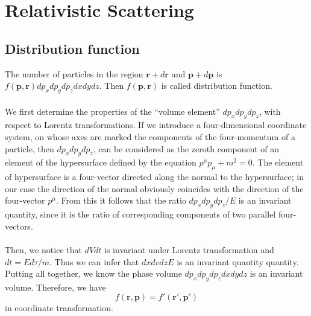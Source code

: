 \section{Relativistic Scattering}
\subsection{Distribution function}
The number of particles in the region $\bm{r}+d\bm{r}$ and $\bm{p} + d\bm{p}$ is $f(\bm{p},\bm{r})dp_x dp_y dp_z dx dy dz$. Then  $f(\bm{p},\bm{r})$ is called distribution function.
\\ \\
We first determine the properties of the ``volume element'' $dp_x dp_y dp_z$, with respect to Lorentz transformations. If we introduce a four-dimensional coordinate system, on whose axes are marked the components of the four-momentum of a particle, then $dp_x dp_y dp_z$, can be considered as the zeroth component of an element of the hypersurface defined by the equation $p^{\mu}p_{\mu} + m^2 = 0$. The element of hypersurface is a four-vector directed along the normal to the hypersurface; in our case the direction of the normal obviously coincides with the direction of the four-vector $p^{\mu}$. From this it follows that the ratio $dp_x dp_y dp_z / E$
is an invariant quantity, since it is the ratio of corresponding components of two parallel four-vectors.
\\ \\
Then, we notice that $dVdt$ is invariant under Lorentz transformation and $dt = {E d\tau}/{m}  $. Thus we can infer that $dx dv dz E$
is an invariant quantity quantity. 
Putting all together, we know the phase volume $dp_x dp_y dp_z dx dy dz$ is an invariant volume.
Therefore, we have
\[f(\bm{r},\bm{p}) = f'(\bm{r}',\bm{p}')\]
in coordinate transformation.

